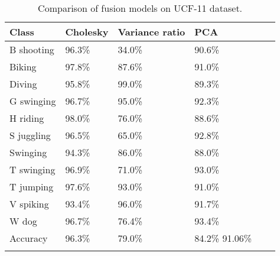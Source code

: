 \begin{table}[]
\centering
\begin{tabular}{|l||l|l|l|l|l|}
\hline
Class            & Cholesky & Variance ratio & PCA   \\ \hline  \hline
B shooting       & 96.3\%    &  34.0\%   &  90.6\%  \\ 
Biking           & 97.8\%    &  87.6\%   &  91.0\%    \\ 
Diving           & 95.8\%    &  99.0\%   &  89.3\%   \\ 
G swinging       & 96.7\%    &  95.0\%   &  92.3\%   \\ 
H riding         & 98.0\%    &  76.0\%   &  88.6\%    \\ 
S juggling       & 96.5\%    &  65.0\%   &  92.8\%    \\ 
Swinging         & 94.3\%    &  86.0\%   &  88.0\%    \\ 
T swinging       & 96.9\%    &  71.0\%   &  93.0\%   \\ 
T jumping        & 97.6\%    &  93.0\%   &  91.0\%    \\ 
V spiking        & 93.4\%    &  96.0\%   &  91.7\%   \\ 
W dog            & 96.7\%    &  76.4\%   &  93.4\%   \\ \hline \hline
Accuracy &  96.3\%   &  79.0\%   &  84.2\%  91.06\%   \\ \hline
\label{tbl:per-action fusionucf}
\end{tabular}
\caption{Comparison of fusion models on UCF-11 dataset.}
\end{table}

